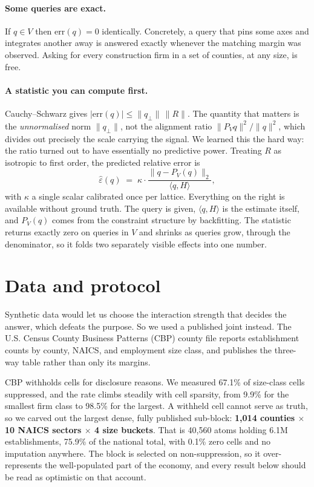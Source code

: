 \documentclass[11pt]{article}
\begin{document}
\paragraph{Some queries are exact.} If $q \in V$ then $\mathrm{err}(q) = 0$
identically. Concretely, a query that pins some axes and integrates another away
is answered exactly whenever the matching margin was observed. Asking for every
construction firm in a set of counties, at any size, is free.

\paragraph{A statistic you can compute first.} Cauchy--Schwarz gives
$|\mathrm{err}(q)| \le \lVert q_\perp \rVert \, \lVert R \rVert$. The quantity
that matters is the \emph{unnormalised} norm $\lVert q_\perp \rVert$, not the
alignment ratio $\lVert P_V q\rVert^2/\lVert q\rVert^2$, which divides out
precisely the scale carrying the signal. We learned this the hard way: the ratio
turned out to have essentially no predictive power. Treating $R$ as isotropic to
first order, the predicted relative error is
\begin{equation}
  \widehat{\varepsilon}(q) \;=\; \kappa \cdot
  \frac{\lVert q - P_V(q) \rVert_2}{\langle q, H\rangle},
  \label{eq:predictor}
\end{equation}
with $\kappa$ a single scalar calibrated once per lattice. Everything on the
right is available without ground truth. The query is given, $\langle q,H\rangle$
is the estimate itself, and $P_V(q)$ comes from the constraint structure by
backfitting. The statistic returns exactly zero on queries in $V$ and shrinks as
queries grow, through the denominator, so it folds two separately visible effects
into one number.

\section{Data and protocol}

Synthetic data would let us choose the interaction strength that decides the
answer, which defeats the purpose. So we used a published joint instead. The U.S.
Census County Business Patterns (CBP) county file reports establishment counts by
county, NAICS, and employment size class, and publishes the three-way table
rather than only its margins.

CBP withholds cells for disclosure reasons. We measured 67.1\% of size-class
cells suppressed, and the rate climbs steadily with cell sparsity, from 9.9\% for
the smallest firm class to 98.5\% for the largest. A withheld cell cannot serve
as truth, so we carved out the largest dense, fully published sub-block:
\textbf{1,014 counties $\times$ 10 NAICS sectors $\times$ 4 size buckets}. That
is 40,560 atoms holding 6.1M establishments, 75.9\% of the national total, with
0.1\% zero cells and no imputation anywhere. The block is selected on
non-suppression, so it over-represents the well-populated part of the economy,
and every result below should be read as optimistic on that account.
\end{document}

